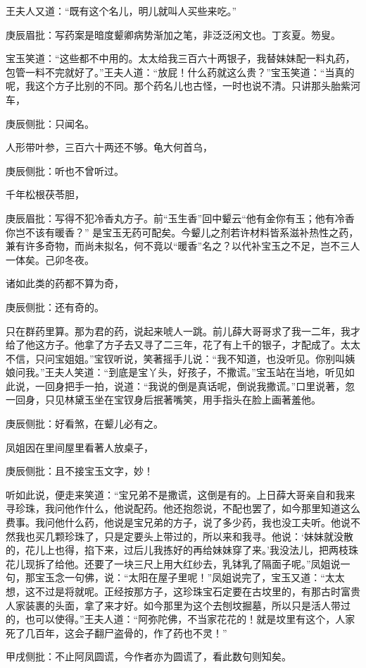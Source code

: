 \begin{parag}
    王夫人又道：“既有这个名儿，明儿就叫人买些来吃。”\begin{note}庚辰眉批：写药案是暗度颦卿病势渐加之笔，非泛泛闲文也。丁亥夏。笏叟。\end{note}宝玉笑道：“这些都不中用的。太太给我三百六十两银子，我替妹妹配一料丸药，包管一料不完就好了。”王夫人道：“放屁！什么药就这么贵？”宝玉笑道：“当真的呢，我这个方子比别的不同。那个药名儿也古怪，一时也说不清。只讲那头胎紫河车，\begin{note}庚辰侧批：只闻名。\end{note}人形带叶参，三百六十两还不够。龟大何首乌，\begin{note}庚辰侧批：听也不曾听过。\end{note}千年松根茯苓胆，\begin{note}庚辰眉批：写得不犯冷香丸方子。前“玉生香”回中颦云“他有金你有玉；他有冷香你岂不该有暖香？” 是宝玉无药可配矣。今颦儿之剂若许材料皆系滋补热性之药，兼有许多奇物，而尚未拟名，何不竟以“暖香”名之？以代补宝玉之不足，岂不三人一体矣。己卯冬夜。\end{note}诸如此类的药都不算为奇，\begin{note}庚辰侧批：还有奇的。\end{note}只在群药里算。那为君的药，说起来唬人一跳。前儿薛大哥哥求了我一二年，我才给了他这方子。他拿了方子去又寻了二三年，花了有上千的银子，才配成了。太太不信，只问宝姐姐。”宝钗听说，笑著摇手儿说：“我不知道，也没听见。你别叫姨娘问我。”王夫人笑道：“到底是宝丫头，好孩子，不撒谎。”宝玉站在当地，听见如此说，一回身把手一拍，说道：“我说的倒是真话呢，倒说我撒谎。”口里说著，忽一回身，只见林黛玉坐在宝钗身后抿著嘴笑，用手指头在脸上画著羞他。\begin{note}庚辰侧批：好看煞，在颦儿必有之。\end{note}
\end{parag}


\begin{parag}
    凤姐因在里间屋里看著人放桌子，\begin{note}庚辰侧批：且不接宝玉文字，妙！\end{note}听如此说，便走来笑道：“宝兄弟不是撒谎，这倒是有的。上日薛大哥亲自和我来寻珍珠，我问他作什么，他说配药。他还抱怨说，不配也罢了，如今那里知道这么费事。我问他什么药，他说是宝兄弟的方子，说了多少药，我也没工夫听。他说不然我也买几颗珍珠了，只是定要头上带过的，所以来和我寻。他说：‘妹妹就没散的，花儿上也得，掐下来，过后儿我拣好的再给妹妹穿了来。’我没法儿，把两枝珠花儿现拆了给他。还要了一块三尺上用大红纱去，乳钵乳了隔面子呢。”凤姐说一句，那宝玉念一句佛，说：“太阳在屋子里呢！”凤姐说完了，宝玉又道：“太太想，这不过是将就呢。正经按那方子，这珍珠宝石定要在古坟里的，有那古时富贵人家装裹的头面，拿了来才好。如今那里为这个去刨坟掘墓，所以只是活人带过的，也可以使得。”王夫人道：“阿弥陀佛，不当家花花的！就是坟里有这个，人家死了几百年，这会子翻尸盗骨的，作了药也不灵！”\begin{note}甲戌侧批：不止阿凤圆谎，今作者亦为圆谎了，看此数句则知矣。\end{note}
\end{parag}


